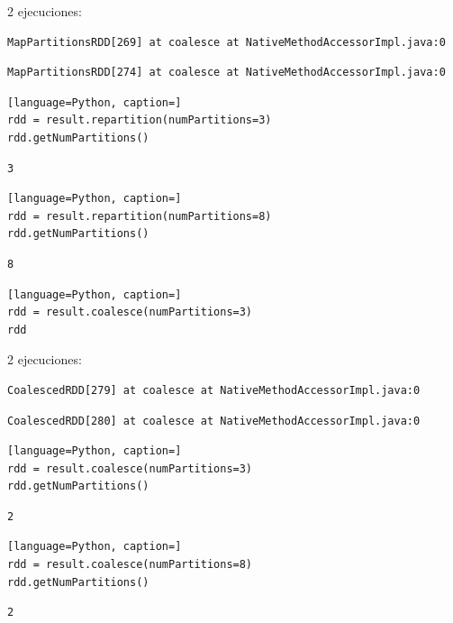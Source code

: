 \documentclass[10pt,swedish, openany]{book}
\begin{document}
2 ejecuciones:
\begin{verbatim}
MapPartitionsRDD[269] at coalesce at NativeMethodAccessorImpl.java:0
\end{verbatim}

\begin{verbatim}
MapPartitionsRDD[274] at coalesce at NativeMethodAccessorImpl.java:0
\end{verbatim}

\begin{lstlisting}[language=Python, caption=]
rdd = result.repartition(numPartitions=3)
rdd.getNumPartitions()
\end{lstlisting}
\begin{verbatim}
3
\end{verbatim}

\begin{lstlisting}[language=Python, caption=]
rdd = result.repartition(numPartitions=8)
rdd.getNumPartitions()
\end{lstlisting}
\begin{verbatim}
8
\end{verbatim}



\begin{lstlisting}[language=Python, caption=]
rdd = result.coalesce(numPartitions=3)
rdd
\end{lstlisting}
2 ejecuciones:

\begin{verbatim}
CoalescedRDD[279] at coalesce at NativeMethodAccessorImpl.java:0
\end{verbatim}

\begin{verbatim}
CoalescedRDD[280] at coalesce at NativeMethodAccessorImpl.java:0
\end{verbatim}

\begin{lstlisting}[language=Python, caption=]
rdd = result.coalesce(numPartitions=3)
rdd.getNumPartitions()
\end{lstlisting}
\begin{verbatim}
2
\end{verbatim}

\begin{lstlisting}[language=Python, caption=]
rdd = result.coalesce(numPartitions=8)
rdd.getNumPartitions()
\end{lstlisting}
\begin{verbatim}
2
\end{verbatim}
\end{document}
